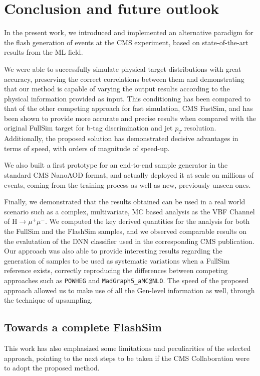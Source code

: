 \chapter{Conclusion and future outlook}\label{ch:outlook} %
In the present work, we introduced and implemented an alternative paradigm for the flash generation of events at the CMS experiment, based on state-of-the-art results from the ML field.

We were able to successfully simulate physical target distributions with great accuracy, preserving the correct correlations between them and demonstrating that our method is capable of varying the output results according to the physical information provided as input. This conditioning has been compared to that of the other competing approach for fast simulation, CMS FastSim, and has been shown to provide more accurate and precise results when compared with the original FullSim target for b-tag discrimination and jet $p_T$ resolution. Additionally, the proposed solution has demonstrated decisive advantages in terms of speed, with orders of magnitude of speed-up.

We also built a first prototype for an end-to-end sample generator in the standard CMS NanoAOD format, and actually deployed it at scale on millions of events, coming from the training process as well as new, previously unseen ones. 

Finally, we demonstrated that the results obtained can be used in a real world scenario such as a complex, multivariate, MC based analysis as the VBF Channel of H$\rightarrow\mu^+\mu^-$. We computed the key derived quantities for the analysis for both the FullSim and the FlashSim samples, and we observed comparable results on the evalutation of the DNN classifier used in the corresponding CMS publication.
Our approach was also able to provide interesting results regarding the generation of samples to be used as systematic variations when a FullSim reference exists, correctly reproducing the differences between competing approaches such as \texttt{POWHEG} and \texttt{MadGraph5\_aMC@NLO}. The speed of the proposed approach allowed us to make use of all the Gen-level information as well, through the technique of upsampling.

\section{Towards a complete FlashSim}
This work has also emphasized some limitations and peculiarities of the selected approach, pointing to the next steps to be taken if the CMS Collaboration were to adopt the proposed method.


